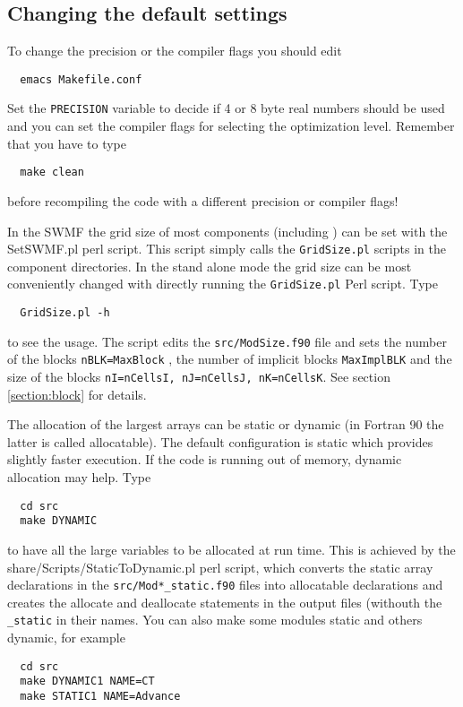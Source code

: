 \subsection{Changing the default settings}

To change the precision or the compiler flags you should edit 
\begin{verbatim}
  emacs Makefile.conf
\end{verbatim}
Set the {\tt PRECISION} variable to decide
if 4 or 8 byte real numbers should be used and you can set the compiler flags
for selecting the optimization level. Remember that you have to type
\begin{verbatim}
  make clean
\end{verbatim}
before recompiling the code with a different precision or compiler flags!

In the SWMF the grid size of most components (including \BATSRUS) can
be set with the SetSWMF.pl perl script. This script simply calls
the {\tt GridSize.pl} scripts in the component directories.
In the stand alone mode the grid size can be most conveniently 
changed with directly running the {\tt GridSize.pl} Perl script. Type
\begin{verbatim}
  GridSize.pl -h
\end{verbatim}
to see the usage. The script edits the {\tt src/ModSize.f90} file
and sets the number of the blocks {\tt nBLK=MaxBlock}
, the number of implicit blocks {\tt MaxImplBLK}             %
and the size of the blocks {\tt nI=nCellsI, nJ=nCellsJ, nK=nCellsK}. 
See section \ref{section:block} for details.

The allocation of the largest arrays can be static or dynamic
(in Fortran 90 the latter is called allocatable). The default
configuration is static which provides slightly faster execution.
If the code is running out of memory, dynamic allocation may help.
Type
\begin{verbatim}
  cd src
  make DYNAMIC
\end{verbatim}
to have all the large variables to be allocated at run time.
This is achieved by the share/Scripts/StaticToDynamic.pl perl
script, which converts the static array declarations in the
{\tt src/Mod*\_static.f90} files into
allocatable declarations and creates the allocate and deallocate
statements in the output files (withouth the {\tt \_static} in their
names. You can also make some modules static and others dynamic, for example
\begin{verbatim}
  cd src
  make DYNAMIC1 NAME=CT
  make STATIC1 NAME=Advance
\end{verbatim}

